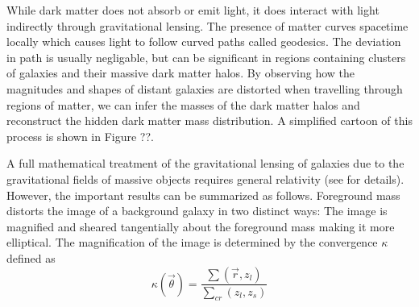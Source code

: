 \documentclass[%
 reprint,
 amsmath,amssymb,
 aps,nofootinbib
]{revtex4-1}
\begin{document}
While dark matter does not absorb or emit light, it does interact with light indirectly through gravitational lensing. The presence of matter curves spacetime locally which causes light to follow curved paths called geodesics. The deviation in path is usually negligable, but can be significant in regions containing clusters of galaxies and their massive dark matter halos. By observing how the magnitudes and shapes of distant galaxies are distorted when travelling through regions of matter, we can infer the masses of the dark matter halos and reconstruct the hidden dark matter mass distribution. A simplified cartoon of this process is shown in Figure ??.


A full mathematical treatment of the gravitational lensing of galaxies due to the gravitational fields of massive objects requires general relativity (see \cite{modern_cosmology} for details). However, the important results can be summarized as follows. Foreground mass distorts the image of a background galaxy in two distinct ways: The image is magnified and sheared tangentially about the foreground mass making it more elliptical. The magnification of the image is determined by the convergence $\kappa$ defined as
\begin{equation}\label{convergence}
\kappa(\vec{\theta})=\frac{\sum(\vec{r},z_l)}{\sum_{cr}(z_l,z_s)}
\end{equation}
\end{document}
